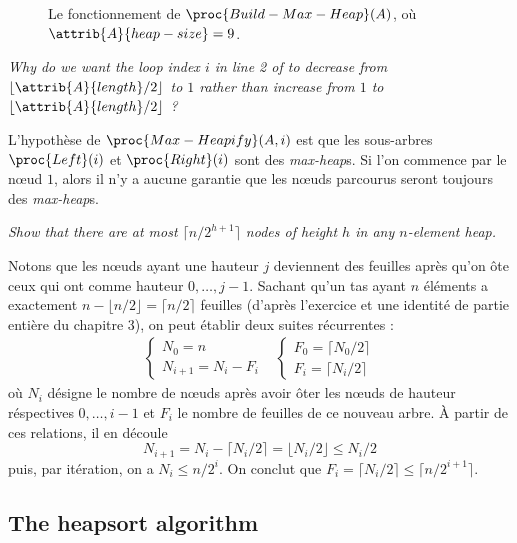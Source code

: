 \begin{description}
\begin{ex}
\begin{figure}[H]
        \caption{Le fonctionnement de $\proc{Build-Max-Heap}(A)$, o\`u $\attrib{A}{heap-size}= 9$.} 
        \label{fig:Build-Max-Heap}
      \end{figure}
    \end{ex}
     \textit{Why do we want the loop index $i$ in line 2 of  to decrease from
$\lfloor \attrib{A}{length}/2 \rfloor$ to $1$ rather than increase from $1$ to $\lfloor \attrib{A}{length}/2 \rfloor$ ?}
    \begin{ex}
	  L'hypoth\`ese de $\proc{Max-Heapify}(A,i)$ est que les sous-arbres $\proc{Left}(i)$ et $\proc{Right}(i)$ sont des \textit{max-heap}s. Si l'on commence par le n\oe ud $1$, alors il n'y a aucune garantie que les n\oe uds parcourus seront toujours des \textit{max-heap}s.
    \end{ex}
     \textit{Show that there are at most $\lceil n/2^{h+1}\rceil$ nodes of height $h$ in any $n$-element heap.}
    \begin{ex} %
      Notons que les n\oe uds ayant une hauteur $j$ deviennent des feuilles apr\`es qu'on \^ote ceux qui ont comme hauteur $0, \ldots, j-1$. Sachant qu'un tas ayant $n$ \'el\'ements a exactement $n - \lfloor n/2 \rfloor = \lceil n/2 \rceil$ feuilles (d'apr\`es l'exercice  et une identit\'e de partie enti\`ere du chapitre 3), on peut \'etablir deux suites r\'ecurrentes :
\[
\begin{matrix}
\left\{
	\begin{array}{ll}
	N_0 = n\\
	N_{i+1} = N_i - F_i
	\end{array}
\right.  &
\left\{
	\begin{array}{ll}
	F_0 = \lceil N_0/2 \rceil\\
	F_i = \lceil N_i/2 \rceil
	\end{array}
  \right. 
\end{matrix}
\]
o\`u $N_i$ d\'esigne le nombre de n\oe uds apr\`es avoir \^oter les n\oe uds de hauteur r\'espectives $0, \ldots, i-1$ et $F_i$ le nombre de feuilles de ce nouveau arbre.
\`A partir de ces relations, il en d\'ecoule 
\[ N_{i+1} = N_i - \lceil N_i/2 \rceil = \lfloor N_i/2 \rfloor \le N_i/2 \]
puis, par it\'eration, on a $N_i \le n/2^i$. On conclut que $F_i = \lceil N_i/2 \rceil \le \lceil n/2^{i+1} \rceil$.
    \end{ex}
\end{description}

\subsection{The heapsort algorithm}

